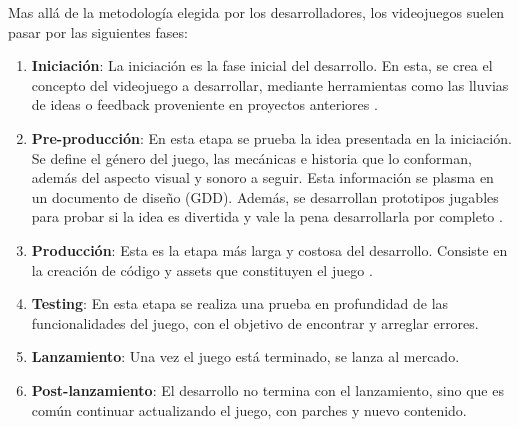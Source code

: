 \par Mas allá de la metodología elegida por los desarrolladores, los videojuegos suelen pasar por las siguientes fases:
\begin{enumerate}
    \item \textbf{Iniciación}: La iniciación es la fase inicial del desarrollo. En esta, se crea el concepto del videojuego a desarrollar, mediante herramientas como las lluvias de ideas o feedback proveniente en proyectos anteriores \cite{shresthaGameDevelopmentLifecycle2023,widjajaUtilizingGameDevelopment2024,ramadanGameDevelopmentLife2013}.
    \item \textbf{Pre-producción}:  En esta etapa se prueba la idea presentada en la iniciación. Se define el género del juego, las mecánicas e historia que lo conforman, además del aspecto visual y sonoro a seguir. Esta información se plasma en un documento de diseño (GDD). Además, se desarrollan prototipos jugables para probar si la idea es divertida y vale la pena desarrollarla por completo \cite{shresthaGameDevelopmentLifecycle2023,widjajaUtilizingGameDevelopment2024,ramadanGameDevelopmentLife2013}.
    \item \textbf{Producción}: Esta es la etapa más larga y costosa del desarrollo. Consiste en la creación de código y assets que constituyen el juego \cite{shresthaGameDevelopmentLifecycle2023,widjajaUtilizingGameDevelopment2024,ramadanGameDevelopmentLife2013}.
    \item \textbf{Testing}: En esta etapa se realiza una prueba en profundidad de las funcionalidades del juego, con el objetivo de encontrar y arreglar errores.
    \item \textbf{Lanzamiento}:  Una vez el juego está terminado, se lanza al mercado.
    \item \textbf{Post-lanzamiento}: El desarrollo no termina con el lanzamiento, sino que es común continuar actualizando el juego, con parches y nuevo contenido.
\end{enumerate}